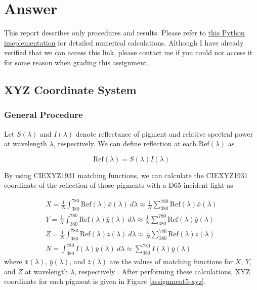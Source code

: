 \section{Answer}

This report describes only procedures and results. Please refer to \href{https://colab.research.google.com/drive/1KD-4itGSez7aZ8Xvt2FDbf4bOZyQURiZ?usp=sharing}{\underline{this Python imeplementation}} for detailed numerical calculations. Although I have already verified that we can access this link, please contact me if you could not access it for some reason when grading this assignment.

\subsection{XYZ Coordinate System}

\subsubsection{General Procedure}
Let $S(\lambda)$ and $I(\lambda)$ denote reflectance of pigment and relative spectral power at wavelength $\lambda$, respectively. We can define reflection at each $\text{Ref}(\lambda)$ as

\begin{equation}
    \text{Ref}(\lambda) = S(\lambda)I(\lambda)
\end{equation}

By using CIEXYZ1931 matching functions, we can calculate the CIEXYZ1931 coordinate of the reflection of those pigments with a D65 incident light as

\begin{subequations}
    \begin{gather}
        X = \frac{1}{N}\int_{380}^{780} \text{Ref}(\lambda) \bar{x}(\lambda) ~d\lambda \approx \frac{1}{N}\sum_{380}^{780} \text{Ref}(\lambda) \bar{x}(\lambda)\\
        Y = \frac{1}{N}\int_{380}^{780} \text{Ref}(\lambda) \bar{y}(\lambda) ~d\lambda \approx \frac{1}{N}\sum_{380}^{780} \text{Ref}(\lambda) \bar{y}(\lambda)\\
        Z = \frac{1}{N}\int_{380}^{780} \text{Ref}(\lambda) \bar{z}(\lambda) ~d\lambda \approx \frac{1}{N}\sum_{380}^{780} \text{Ref}(\lambda) \bar{z}(\lambda)\\
        N = \int_{380}^{780} I(\lambda) \bar{y}(\lambda) ~d\lambda \approx \sum_{380}^{780} I(\lambda) \bar{y}(\lambda)
    \end{gather}
\end{subequations}
where $\bar{x}(\lambda)$, $\bar{y}(\lambda)$, and $\bar{z}(\lambda)$ are the values of matching functions for $X$, $Y$, and $Z$ at wavelength $\lambda$, respectively \cite{assignment5-xyz-wikipedia}. After performing these calculations, XYZ coordinate for each pigment is given in Figure \ref{assignment5-xyz}.

